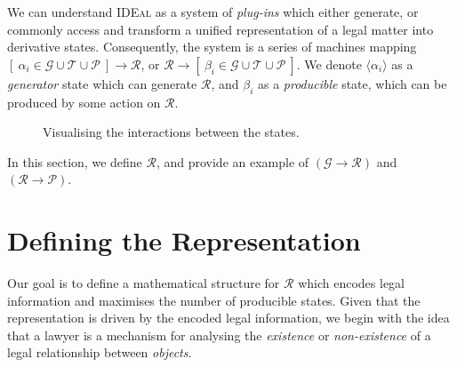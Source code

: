 \documentclass{article}
\newcounter{pic}[page]
\newcounter{fig}[page]
\numberwithin{equation}{section}
\newcommand{\ideal}{\textsc{IDEal }}
\newcommand{\braket}[1]{\langle #1 \rangle}
\begin{document}
We can understand \ideal as a system of \textit{plug-ins} which either generate, or commonly access and transform a unified representation of a legal matter into derivative states. Consequently, the system is a series of machines mapping $[ \ \alpha_i \in \mathcal{G \cup T \cup P} \ ] \rightarrow \mathcal{R}$, or $\mathcal{R} \rightarrow [ \ \beta_i \in \mathcal{G \cup T \cup P} \ ]$. We denote $\braket{\alpha_i}$ as a \textit{generator} state which can generate $\mathcal{R}$, and $\beta_i$ as a \textit{producible} state, which can be produced by some action on $\mathcal{R}$.
\begin{figure}[h]
\begin{center}
\end{center}
\caption{Visualising the interactions between the states.}
\end{figure}

In this section, we define $\mathcal{R}$, and provide an example of $(\mathcal{G} \rightarrow \mathcal{R})$ and $(\mathcal{R} \rightarrow \mathcal{P})$.



\section{Defining the Representation}

Our goal is to define a mathematical structure for $\mathcal{R}$ which encodes legal information and maximises the number of producible states. Given that the representation is driven by the encoded legal information, we begin with the idea that a lawyer is a mechanism for analysing the \textit{existence} or \textit{non-existence} of a legal relationship between \textit{objects}. 
\end{document}
